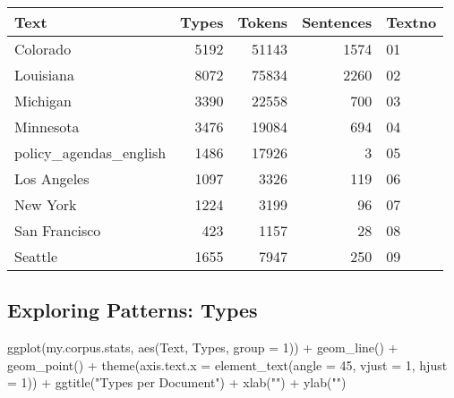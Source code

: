 \documentclass[
]{article}
\newenvironment{Shaded}{\begin{snugshade}}{\end{snugshade}}
\newcommand{\AttributeTok}[1]{\textcolor[rgb]{0.77,0.63,0.00}{#1}}
\newcommand{\DecValTok}[1]{\textcolor[rgb]{0.00,0.00,0.81}{#1}}
\newcommand{\FunctionTok}[1]{\textcolor[rgb]{0.00,0.00,0.00}{#1}}
\newcommand{\NormalTok}[1]{#1}
\newcommand{\OtherTok}[1]{\textcolor[rgb]{0.56,0.35,0.01}{#1}}
\newcommand{\SpecialCharTok}[1]{\textcolor[rgb]{0.00,0.00,0.00}{#1}}
\newcommand{\StringTok}[1]{\textcolor[rgb]{0.31,0.60,0.02}{#1}}
\begin{document}
\begin{Shaded}
\end{Shaded}

\begin{table}
\centering
\begin{tabular}[t]{l|r|r|r|l}
\hline
Text & Types & Tokens & Sentences & Textno\\
\hline
Colorado & 5192 & 51143 & 1574 & 01\\
\hline
Louisiana & 8072 & 75834 & 2260 & 02\\
\hline
Michigan & 3390 & 22558 & 700 & 03\\
\hline
Minnesota & 3476 & 19084 & 694 & 04\\
\hline
policy\_agendas\_english & 1486 & 17926 & 3 & 05\\
\hline
Los Angeles & 1097 & 3326 & 119 & 06\\
\hline
New York & 1224 & 3199 & 96 & 07\\
\hline
San Francisco & 423 & 1157 & 28 & 08\\
\hline
Seattle & 1655 & 7947 & 250 & 09\\
\hline
\end{tabular}
\end{table}

\hypertarget{exploring-patterns-types}{%
\subsection{Exploring Patterns: Types}\label{exploring-patterns-types}}

\begin{Shaded}
\begin{Highlighting}[]
\FunctionTok{ggplot}\NormalTok{(my.corpus.stats, }\FunctionTok{aes}\NormalTok{(Text, Types, }\AttributeTok{group =} \DecValTok{1}\NormalTok{)) }\SpecialCharTok{+} \FunctionTok{geom\_line}\NormalTok{() }\SpecialCharTok{+} \FunctionTok{geom\_point}\NormalTok{() }\SpecialCharTok{+} \FunctionTok{theme}\NormalTok{(}\AttributeTok{axis.text.x =} \FunctionTok{element\_text}\NormalTok{(}\AttributeTok{angle =} \DecValTok{45}\NormalTok{, }\AttributeTok{vjust =} \DecValTok{1}\NormalTok{, }\AttributeTok{hjust =} \DecValTok{1}\NormalTok{)) }\SpecialCharTok{+} \FunctionTok{ggtitle}\NormalTok{(}\StringTok{"Types per Document"}\NormalTok{) }\SpecialCharTok{+} \FunctionTok{xlab}\NormalTok{(}\StringTok{""}\NormalTok{) }\SpecialCharTok{+} \FunctionTok{ylab}\NormalTok{(}\StringTok{""}\NormalTok{)}
\end{Highlighting}
\end{Shaded}
\end{document}
